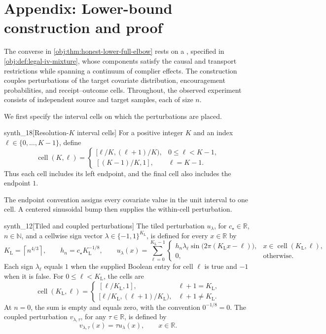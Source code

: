 \section{Appendix: Lower-bound construction and proof}
\label{sec:lower-appendix}

The converse in \cref{obj:thm:honest-lower-full-elbow} rests on a , specified in \cref{obj:def:legal-iv-mixture}, whose components satisfy the causal and transport restrictions while spanning a continuum of complier effects. The construction couples perturbations of the target covariate distribution, encouragement probabilities, and receipt--outcome cells. Throughout, the observed experiment consists of independent source and target samples, each of size \(n\).

We first specify the interval cells on which the perturbations are placed.

\begin{definitionv}{synth_18}[Resolution-\(K\) interval cells]
For a positive integer \(K\) and an index \(\ell\in\{0,\ldots,K-1\}\), define
\[
\operatorname{cell}(K,\ell)=
\begin{cases}
[\ell/K,(\ell+1)/K),&0\le\ell<K-1,\\
[(K-1)/K,1],&\ell=K-1.
\end{cases}
\]
Thus each cell includes its left endpoint, and the final cell also includes the endpoint \(1\).
\end{definitionv}

The endpoint convention assigns every covariate value in the unit interval to one cell. A centered sinusoidal bump then supplies the within-cell perturbation.

\begin{definitionv}{synth_12}[Tiled and coupled perturbations]
The tiled perturbation \(u_{\lambda}\), for \(c_{\star}\in\mathbb R\), \(n\in\mathbb N\), and a cellwise sign vector \(\lambda\in\{-1,1\}^{K_{\mathrm L}}\), is defined for every \(x\in\mathbb R\) by
\[
K_{\mathrm L}=\left\lceil n^{4/3}\right\rceil,
\qquad
h_n=c_{\star}K_{\mathrm L}^{-1/8},
\qquad
u_{\lambda}(x)=
\sum_{\ell=0}^{K_{\mathrm L}-1}
\begin{cases}
h_n\lambda_\ell\sin\!\bigl(2\pi(K_{\mathrm L}x-\ell)\bigr),
& x\in\operatorname{cell}(K_{\mathrm L},\ell),\\
0,&\text{otherwise}.
\end{cases}
\]
Each sign \(\lambda_\ell\) equals \(1\) when the supplied Boolean entry for cell \(\ell\) is true and \(-1\) when it is false. For \(0\leq\ell<K_{\mathrm L}\), the cells are
\[
\operatorname{cell}(K_{\mathrm L},\ell)=
\begin{cases}
[\ell/K_{\mathrm L},1],
& \ell+1=K_{\mathrm L},\\
[\ell/K_{\mathrm L},(\ell+1)/K_{\mathrm L}),
& \ell+1\ne K_{\mathrm L}.
\end{cases}
\]
At \(n=0\), the sum is empty and equals zero, with the convention \(0^{-1/8}=0\).
The coupled perturbation \(v_{\lambda,\tau}\), for any \(\tau\in\mathbb R\), is defined by
\[
v_{\lambda,\tau}(x)=\tau u_{\lambda}(x),
\qquad x\in\mathbb R.
\]
\end{definitionv}

